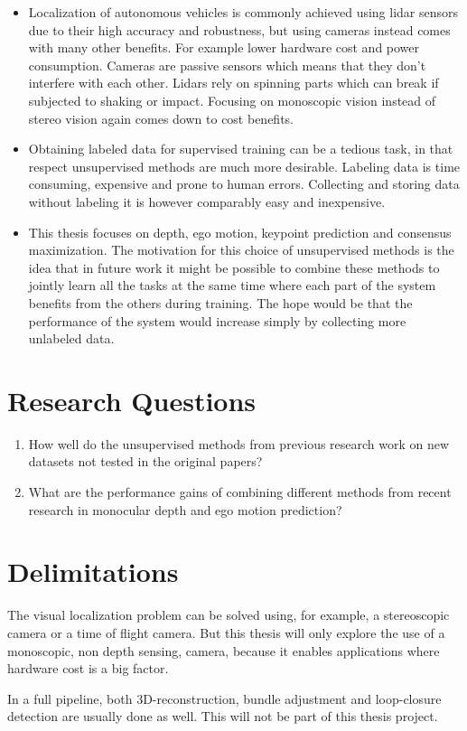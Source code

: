 \begin{itemize}
	\item Localization of autonomous vehicles is commonly  achieved using lidar sensors due to their high accuracy and robustness, but using cameras instead comes with many other benefits. For example lower hardware cost and power consumption. Cameras are passive sensors which means that they don't interfere with each other. Lidars rely on spinning parts which can break if subjected to shaking or impact. Focusing on monoscopic vision instead of stereo vision again comes down to cost benefits.
	
	\item Obtaining labeled data for supervised training can be a tedious task, in that respect unsupervised methods are much more desirable. Labeling data is time consuming, expensive and prone to human errors. Collecting and storing data without labeling it is however comparably easy and inexpensive.
	
	\item This thesis focuses on depth, ego motion, keypoint prediction and consensus maximization. The motivation for this choice of unsupervised methods is the idea that in future work it might be possible to combine these methods to jointly learn all the tasks at the same time where each part of the system benefits from the others during training. The hope would be that the performance of the system would increase simply by collecting more unlabeled data.
\end{itemize}

\section{Research Questions}

\begin{enumerate}
	
	\item How well do the unsupervised methods from previous research work on new datasets not tested in the original papers?
	
	\item What are the performance gains of combining different methods from recent research in monocular depth and ego motion prediction?
	
\end{enumerate}

\section{Delimitations}

The visual localization problem can be solved using, for example, a stereoscopic camera or a time of flight camera. But this thesis will only explore the use of a monoscopic, non depth sensing, \abbrRGB camera, because it enables applications where hardware cost is a big factor.

In a full \abbrSFM pipeline, both 3D-reconstruction, bundle adjustment and loop-closure detection are usually done as well. This will not be part of this thesis project.